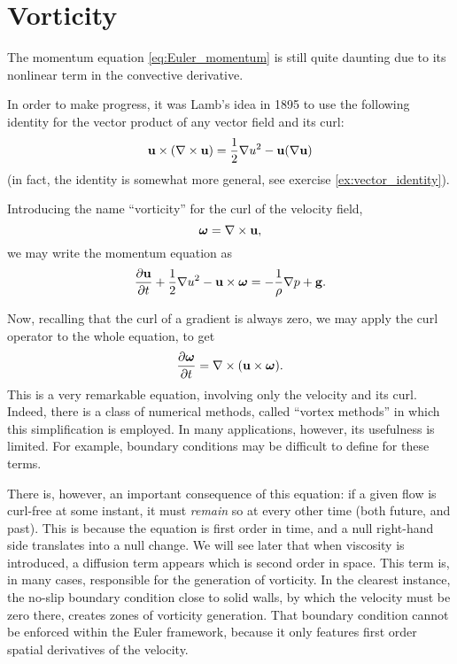 \section{Vorticity}

The momentum equation \ref{eq:Euler_momentum} is still quite daunting
due to its nonlinear term in the convective derivative.

In order to make progress, it was Lamb's idea in 1895 to use the
following identity for the vector product of any vector field and its
curl:
\[
\mathbf{u} \times ( \nabla\times \mathbf{u}) =
\frac12 \nabla u^2 - \mathbf{u} (\nabla \mathbf{u} )
\]
(in fact, the identity is somewhat more general, see exercise
\ref{ex:vector_identity}).

Introducing the name ``vorticity'' for the curl of the velocity field,
\[
\bm{\omega} = \nabla\times\mathbf{u} ,
\]
we may write the momentum equation as
\begin{equation}
  \label{eq:Euler_momentum_w_vort}
  \frac{\partial \mathbf{u} }{\partial t} +
  \frac12 \nabla u^2 - \mathbf{u} \times\bm{\omega} =
  - \frac{1}{\rho} \nabla p 
  + \mathbf{g} .
\end{equation}

Now, recalling that the curl of a gradient is always zero,
we may apply the curl operator to the whole equation, to get
\[
\frac{\partial \bm{\omega} }{\partial t} =
\nabla\times(\mathbf{u}\times\bm{\omega}) .
\]
This is a very remarkable equation, involving only the velocity
and its curl. Indeed, there is a class of numerical methods,
called ``vortex methods'' in which this simplification is employed.
In many applications, however, its usefulness is limited. For
example, boundary conditions may be difficult to define for these terms.

There is, however, an important consequence of this equation: if a
given flow is curl-free at some instant, it must \emph{remain} so
at every other time (both future, and past). This is because the equation
is first order in time, and a null right-hand side translates into
a null change. We will see later that when viscosity is introduced,
a diffusion term appears which is second order in space. This term
is, in many cases, responsible for the generation of vorticity.
In the clearest instance, the no-slip boundary condition close
to solid walls, by which the velocity must be zero there, creates
zones of vorticity generation. That boundary condition cannot be
enforced within the Euler framework, because it only features first order
spatial derivatives of the velocity.
